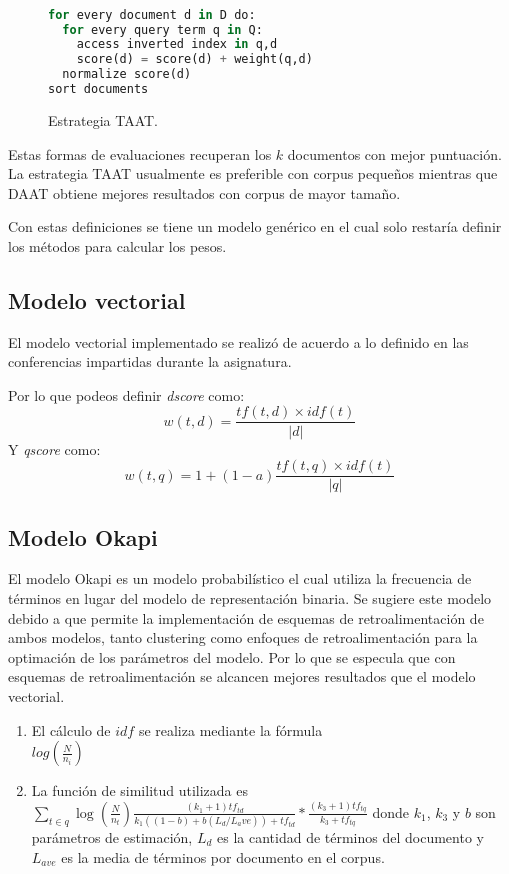 \documentclass[a4paper,10pt,twocolumn]{article}
\begin{document}
    \begin{figure}[htb]%
		\begin{lstlisting}[language=python]%

for every document d in D do:
  for every query term q in Q:
    access inverted index in q,d
    score(d) = score(d) + weight(q,d)
  normalize score(d)
sort documents
		\end{lstlisting}
	\caption{Estrategia TAAT.\label{fig:code}}
	\end{figure}

	Estas formas de evaluaciones recuperan los $k$ documentos con mejor puntuaci\'on. La estrategia
    TAAT usualmente es preferible con corpus peque\~nos mientras que DAAT obtiene mejores resultados
    con corpus de mayor tama\~no.

    Con estas definiciones se tiene un modelo gen\'erico en el cual solo restar\'ia definir los m\'etodos
    para calcular los pesos.

	\subsection{Modelo vectorial}\label{sub:figures}
	El modelo vectorial implementado se realiz\'o de acuerdo a lo definido en las conferencias impartidas
	durante la asignatura.

    Por lo que podeos definir \textit{dscore} como:
    $$
        w(t,d) = \frac{tf(t,d) \times idf(t)}{|d|}
    $$
    Y \textit{qscore} como:
    $$
        w(t,q) = 1 + (1 - a) \frac{tf(t,q) \times idf(t) }{|q|}
    $$

	\subsection{Modelo Okapi}\label{sub:figures}

	El modelo Okapi es un modelo probabil\'istico el cual utiliza la frecuencia de t\'erminos en lugar del modelo
	de representaci\'on binaria. Se sugiere este modelo debido a que permite la implementaci\'on de esquemas de retroalimentaci\'on de ambos modelos,
	tanto clustering como enfoques de retroalimentaci\'on para la optimaci\'on de los par\'ametros del modelo. Por lo que se especula que con esquemas de
	retroalimentaci\'on se alcancen mejores resultados que el modelo vectorial.

	\begin{enumerate}
		\item El c\'alculo de $idf$ se realiza mediante la f\'ormula \\ $log(\frac{N}{n_i})$ 
		\item La funci\'on de similitud utilizada es 
		$ \sum_{t\in q} \log (\frac{N}{n_t}) \frac{(k_1 + 1)tf_{td}}{k_1((1-b) + b(L_d/L_ave)) + tf_{td}} * \frac{(k_3 + 1) tf_{tq}}{ k_3 + tf_{tq} } $
		donde $k_1$, $k_3$ y $b$ son par\'ametros de estimaci\'on, $L_d$ es la cantidad de t\'erminos del documento y $L_{ave}$ es la media de t\'erminos por documento 
		en el corpus.
	\end{enumerate}
\end{document}
